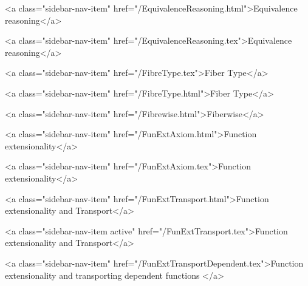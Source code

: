       
    
      
        
          <a class="sidebar-nav-item" href="/EquivalenceReasoning.html">Equivalence reasoning</a>
        
      
    
      
        
          <a class="sidebar-nav-item" href="/EquivalenceReasoning.tex">Equivalence reasoning</a>
        
      
    
      
        
          <a class="sidebar-nav-item" href="/FibreType.tex">Fiber Type</a>
        
      
    
      
        
          <a class="sidebar-nav-item" href="/FibreType.html">Fiber Type</a>
        
      
    
      
        
          <a class="sidebar-nav-item" href="/Fibrewise.html">Fiberwise</a>
        
      
    
      
        
          <a class="sidebar-nav-item" href="/FunExtAxiom.html">Function extensionality</a>
        
      
    
      
        
          <a class="sidebar-nav-item" href="/FunExtAxiom.tex">Function extensionality</a>
        
      
    
      
        
          <a class="sidebar-nav-item" href="/FunExtTransport.html">Function extensionality and Transport</a>
        
      
    
      
        
          <a class="sidebar-nav-item active" href="/FunExtTransport.tex">Function extensionality and Transport</a>
        
      
    
      
        
          <a class="sidebar-nav-item" href="/FunExtTransportDependent.tex">Function extensionality and transporting dependent functions </a>
        
      
    
      
        
